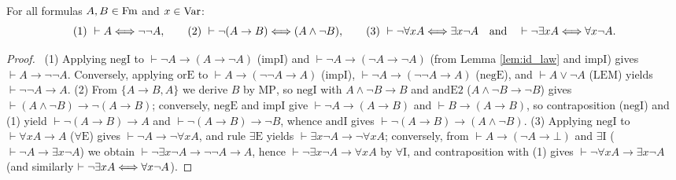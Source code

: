 \documentclass[10pt,a4paper]{article}
\renewcommand{\myprf}{\begin{proof}}
\renewcommand{\myqed}{\end{proof}}
\begin{document}
\begin{lemma}\label{lem:classical_neg}
For all formulas $A, B \in {\textrm{Fm}}$ and $x \in {\textrm{Var}}$:
$$\text{(1) } \vdash A \Longleftrightarrow \neg\neg A, \qquad \text{(2) } \vdash \neg(A \to B) \Longleftrightarrow (A \land \neg B), \qquad \text{(3) } \vdash \neg \forall x A \Longleftrightarrow \exists x \neg A \quad\text{and}\quad \vdash \neg \exists x A \Longleftrightarrow \forall x \neg A.$$
\end{lemma}
\myprf\ (1) Applying $\textrm{negI}$ to $\vdash \neg A \to (A \to \neg A)$ ($\textrm{impI}$) and $\vdash \neg A \to (\neg A \to \neg A)$ (from Lemma \ref{lem:id_law} and $\textrm{impI}$) gives $\vdash A \to \neg\neg A$. Conversely, applying $\textrm{orE}$ to $\vdash A \to (\neg\neg A \to A)$ ($\textrm{impI}$), $\vdash \neg A \to (\neg\neg A \to A)$ ($\textrm{negE}$), and $\vdash A \lor \neg A$ ($\textrm{LEM}$) yields $\vdash \neg\neg A \to A$. (2) From $\{A \to B, A\}$ we derive $B$ by $\textrm{MP}$, so $\textrm{negI}$ with $A \land \neg B \to B$ and $\textrm{andE2}$ ($A \land \neg B \to \neg B$) gives $\vdash (A \land \neg B) \to \neg(A \to B)$; conversely, $\textrm{negE}$ and $\textrm{impI}$ give $\vdash \neg A \to (A \to B)$ and $\vdash B \to (A \to B)$, so contraposition ($\textrm{negI}$) and (1) yield $\vdash \neg(A \to B) \to A$ and $\vdash \neg(A \to B) \to \neg B$, whence $\textrm{andI}$ gives $\vdash \neg(A \to B) \to (A \land \neg B)$. (3) Applying $\textrm{negI}$ to $\vdash \forall x A \to A$ ($\forall\textrm{E}$) gives $\vdash \neg A \to \neg \forall x A$, and rule $\exists\textrm{E}$ yields $\vdash \exists x \neg A \to \neg \forall x A$; conversely, from $\vdash A \to (\neg A \to \bot)$ and $\exists\textrm{I}$ ($\vdash \neg A \to \exists x \neg A$) we obtain $\vdash \neg \exists x \neg A \to \neg\neg A \to A$, hence $\vdash \neg \exists x \neg A \to \forall x A$ by $\forall\textrm{I}$, and contraposition with (1) gives $\vdash \neg \forall x A \to \exists x \neg A$ (and similarly $\vdash \neg \exists x A \Longleftrightarrow \forall x \neg A$). \myqed
\end{document}
